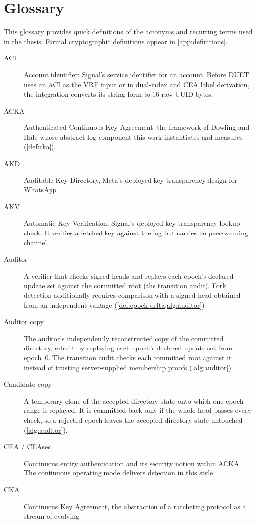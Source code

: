 \chapter{Glossary}\label{app:glossary}

This glossary provides quick definitions of the acronyms and recurring terms used in the thesis.
Formal cryptographic definitions appear in \cref{app:definitions}.

\begin{description}
\item[ACI] Account identifier: Signal's service identifier for an account. Before DUET uses an ACI
  as the VRF input or in dual-index and CEA label derivation, the integration converts its string
  form to 16 raw UUID bytes.
\item[ACKA] Authenticated Continuous Key Agreement, the framework of Dowling and Hale whose abstract
  log component this work instantiates and measures (\cref{def:cka}).
\item[AKD] Auditable Key Directory, Meta's deployed key-transparency design for
  WhatsApp~\cite{whatsapp2023whitepaper}.
\item[AKV] Automatic Key Verification, Signal's deployed key-transparency lookup check. It verifies a
  fetched key against the log but carries no peer-warning channel.
\item[Auditor] A verifier that checks signed heads and replays each epoch's declared update set
  against the committed root (the transition audit). Fork detection additionally requires comparison
  with a signed head obtained from an independent vantage
  (\cref{def:epoch-delta,alg:auditor}).
\item[Auditor copy] The auditor's independently reconstructed copy of the committed directory,
  rebuilt by replaying each epoch's declared update set from epoch~0. The transition audit checks
  each committed root against it instead of trusting server-supplied membership proofs
  (\cref{alg:auditor}).
\item[Candidate copy] A temporary clone of the accepted directory state onto which one epoch range is
  replayed. It is committed back only if the whole head passes every check, so a
  rejected epoch leaves the accepted directory state untouched (\cref{alg:auditor}).
\item[CEA / CEAsec] Continuous entity authentication and its security notion within
  ACKA. The continuous operating mode delivers detection in this style.
\item[CKA] Continuous Key Agreement, the abstraction of a ratcheting protocol as a stream of evolving

\end{description}
